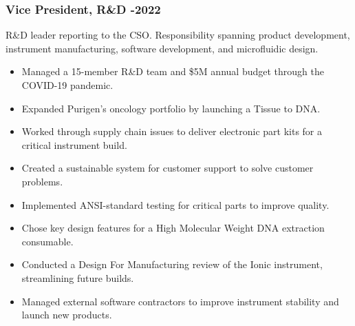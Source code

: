 \documentclass{res}
\begin{document}
\begin{resume}
    \subsubsection{Vice President, R\&D -2022}
      \vspace{-0.1in}
      R\&D leader reporting to the CSO. Responsibility spanning product development, instrument
      manufacturing, software development, and microfluidic design.
      \vspace{0.1in}
       \begin{itemize}
        \item Managed a 15-member R\&D team and \$5M annual budget through the COVID-19 pandemic.
        \item Expanded Purigen's oncology portfolio by launching a Tissue to DNA. 
        \item Worked through supply chain issues to deliver electronic part kits for a critical instrument build.
        \item Created a sustainable system for customer support to solve customer problems.
        \item Implemented ANSI-standard testing for critical parts to improve quality.
        \item Chose key design features for a High Molecular Weight DNA extraction consumable.
        \item Conducted a Design For Manufacturing review of the Ionic instrument, streamlining future builds.
        \item Managed external software contractors to improve instrument stability and launch new products.
       \end{itemize}

      \vspace{-0.2in}

\end{resume}
\end{document}
